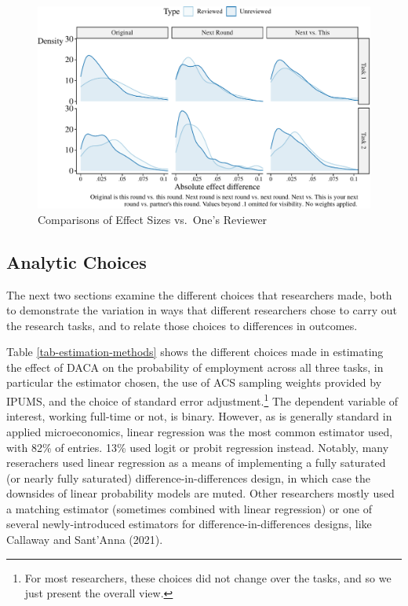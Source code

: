 \documentclass[
  letterpaper,
  DIV=11,
  numbers=noendperiod]{scrartcl}
\begin{document}
\begin{figure}

{\centering \includegraphics{The-Sources-of-Researcher-Variation-in-Economics_files/figure-pdf/fig-like-your-reviewer-1.pdf}

}

\caption{\label{fig-like-your-reviewer}Comparisons of Effect Sizes
vs.~One's Reviewer}

\end{figure}

\hypertarget{sec-analytic}{%
\subsection{Analytic Choices}\label{sec-analytic}}

The next two sections examine the different choices that researchers
made, both to demonstrate the variation in ways that different
researchers chose to carry out the research tasks, and to relate those
choices to differences in outcomes.

Table \ref{tab-estimation-methods} shows the different choices made in
estimating the effect of DACA on the probability of employment across
all three tasks, in particular the estimator chosen, the use of ACS
sampling weights provided by IPUMS, and the choice of standard error
adjustment.\footnote{For most researchers, these choices did not change
  over the tasks, and so we just present the overall view.} The
dependent variable of interest, working full-time or not, is binary.
However, as is generally standard in applied microeconomics, linear
regression was the most common estimator used, with 82\% of entries.
13\% used logit or probit regression instead. Notably, many reserachers
used linear regression as a means of implementing a fully saturated (or
nearly fully saturated) difference-in-differences design, in which case
the downsides of linear probability models are muted. Other researchers
mostly used a matching estimator (sometimes combined with linear
regression) or one of several newly-introduced estimators for
difference-in-differences designs, like Callaway and Sant'Anna (2021).
\end{document}
